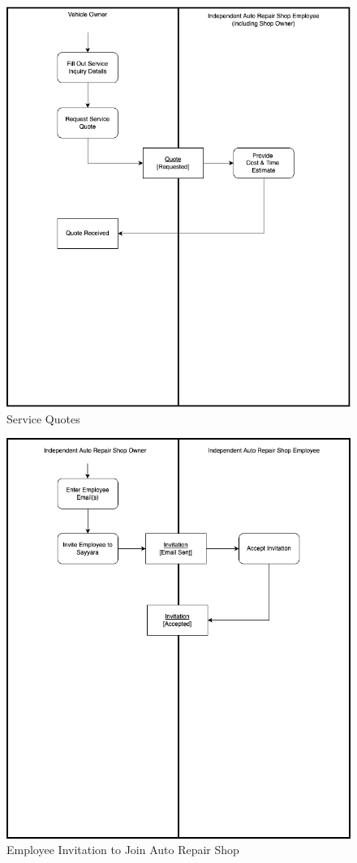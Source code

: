 \documentclass[12pt]{article}
\begin{document}
\begin{figure}[!hbp]
	\centering
	\includegraphics[width=\linewidth/2]{./diagrams/Quotes.png}
	\caption{Service Quotes}
\end{figure}
\FloatBarrier
\begin{figure}[!hbp]
	\centering
	\includegraphics[width=\linewidth/2]{./diagrams/Invitation.png}
	\caption{Employee Invitation to Join Auto Repair Shop}
\end{figure}
\end{document}

